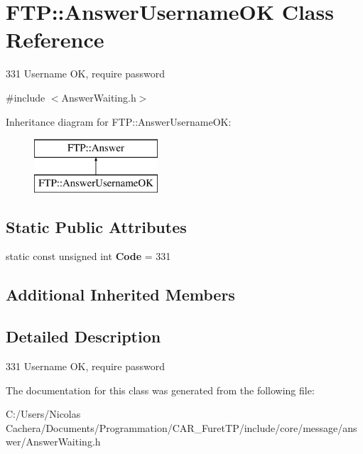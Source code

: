 \hypertarget{classFTP_1_1AnswerUsernameOK}{}\section{F\+T\+P\+:\+:Answer\+Username\+O\+K Class Reference}
\label{classFTP_1_1AnswerUsernameOK}


331 Username O\+K, require password  




{\ttfamily \#include $<$Answer\+Waiting.\+h$>$}

Inheritance diagram for F\+T\+P\+:\+:Answer\+Username\+O\+K\+:\begin{figure}[H]
\begin{center}
\leavevmode
\includegraphics[height=2.000000cm]{classFTP_1_1AnswerUsernameOK}
\end{center}
\end{figure}
\subsection*{Static Public Attributes}
\begin{DoxyCompactItemize}
\item 
\hypertarget{classFTP_1_1AnswerUsernameOK_a2a86e76b47c5d49f642a73173b36a7b1}{}static const unsigned int {\bfseries Code} = 331\label{classFTP_1_1AnswerUsernameOK_a2a86e76b47c5d49f642a73173b36a7b1}

\end{DoxyCompactItemize}
\subsection*{Additional Inherited Members}


\subsection{Detailed Description}
331 Username O\+K, require password 

The documentation for this class was generated from the following file\+:\begin{DoxyCompactItemize}
\item 
C\+:/\+Users/\+Nicolas Cachera/\+Documents/\+Programmation/\+C\+A\+R\+\_\+\+Furet\+T\+P/include/core/message/answer/Answer\+Waiting.\+h\end{DoxyCompactItemize}

